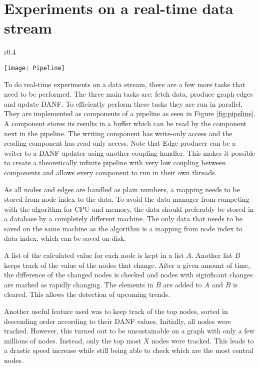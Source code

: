 \section{Experiments on a real-time data stream}

\begin{wrapfigure}{r}{0.4\textwidth}
  \begin{center}
    \texttt{[image: Pipeline]}
  \end{center}
  \caption{Parallel-compatible pipeline layout}
  \label{fig:pipeline}
\end{wrapfigure}

To do real-time experiments on a data stream, there are a few more tasks that need to be performed. The three main tasks are: fetch data, produce graph edges and update DANF. To efficiently perform these tasks they are run in parallel. They are implemented as components of a pipeline as seen in Figure \ref{fig:pipeline}. A component stores its results in a buffer which can be read by the component next in the pipeline. The writing component has write-only access and the reading component has read-only access. Note that Edge producer can be a writer to a DANF updater using another coupling handler. This makes it possible to create a theoretically infinite pipeline with very low coupling between components and allows every component to run in their own threads.

As all nodes and edges are handled as plain numbers, a mapping needs to be stored from node index to the data. To avoid the data manager from competing with the algorithm for CPU and memory, the data should preferably be stored in a database by a completely different machine. The only data that needs to be saved on the same machine as the algorithm is a mapping from node index to data index, which can be saved on disk.

A list of the calculated value for each node is kept in a list $A$. Another list $B$ keeps track of the value of the nodes that change. After a given amount of time, the difference of the changed nodes is checked and nodes with significant changes are marked as rapidly changing. The elements in $B$ are added to $A$ and $B$ is cleared. This allows the detection of upcoming trends. 

Another useful feature used was to keep track of the top nodes, sorted in descending order according to their DANF values. Initially, all nodes were tracked. However, this turned out to be unsustainable on a graph with only a few millions of nodes. Instead, only the top most $X$ nodes were tracked. This leads to a drastic speed increase while still being able to check which are the most central nodes. 



